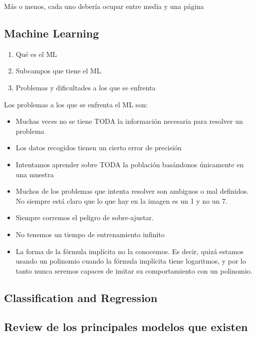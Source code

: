 Más o menos, cada uno debería ocupar entre media y una página
\subsection{Machine Learning}
  \begin{note}
    \begin{enumerate}
      \item Qué es el ML
      \item Subcampos que tiene el ML
      \item Problemas y dificultades a los que se enfrenta
    \end{enumerate}

    Los problemas a los que se enfrenta el ML son:
    \begin{itemize}
      \item Muchas veces no se tiene TODA la información necesaria para
      resolver un problema
      \item Los datos recogidos tienen un cierto error de precisión
      \item Intentamos aprender sobre TODA la población basándonos
      únicamente en una muestra
      \item Muchos de los problemas que intenta resolver son ambiguos o mal
      definidos. No siempre está claro que lo que hay en la imagen es un 1 y
      no un 7.
      \item Siempre corremos el peligro de sobre-ajustar.
      \item No tenemos un tiempo de entrenamiento infinito
      \item La forma de la fórmula implícita no la conocemos. Es decir, quizá
      estamos usando un polinomio cuando la fórmula implícita tiene logaritmos,
      y por lo tanto nunca seremos capaces de imitar su comportamiento con un
      polinomio.
    \end{itemize}

  \end{note}
\subsection{Classification and Regression}
\subsection{Review de los principales modelos que existen}

